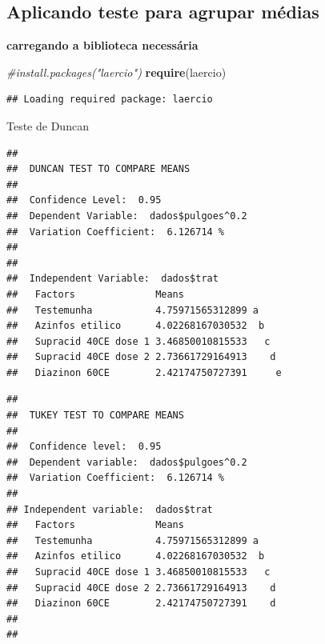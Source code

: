 \documentclass[
]{book}
\newenvironment{Shaded}{\begin{snugshade}}{\end{snugshade}}
\newcommand{\CommentTok}[1]{\textcolor[rgb]{0.56,0.35,0.01}{\textit{#1}}}
\newcommand{\KeywordTok}[1]{\textcolor[rgb]{0.13,0.29,0.53}{\textbf{#1}}}
\newcommand{\NormalTok}[1]{#1}
\newcommand{\StringTok}[1]{\textcolor[rgb]{0.31,0.60,0.02}{#1}}
\begin{document}
\hypertarget{aplicando-teste-para-agrupar-muxe9dias}{%
\subsection{Aplicando teste para agrupar médias}\label{aplicando-teste-para-agrupar-muxe9dias}}

\textbf{carregando a biblioteca necessária}

\begin{Shaded}
\begin{Highlighting}[]
\CommentTok{#install.packages("laercio")}
\KeywordTok{require}\NormalTok{(laercio)}
\end{Highlighting}
\end{Shaded}

\begin{verbatim}
## Loading required package: laercio
\end{verbatim}

Teste de Duncan

\begin{Shaded}
\end{Shaded}

\begin{verbatim}
## 
##  DUNCAN TEST TO COMPARE MEANS 
##  
##  Confidence Level:  0.95 
##  Dependent Variable:  dados$pulgoes^0.2
##  Variation Coefficient:  6.126714 % 
##  
## 
##  Independent Variable:  dados$trat 
##   Factors              Means                 
##   Testemunha           4.75971565312899 a    
##   Azinfos etilico      4.02268167030532  b   
##   Supracid 40CE dose 1 3.46850010815533   c  
##   Supracid 40CE dose 2 2.73661729164913    d 
##   Diazinon 60CE        2.42174750727391     e
\end{verbatim}

\begin{Shaded}
\end{Shaded}

\begin{verbatim}
## 
##  TUKEY TEST TO COMPARE MEANS 
##  
##  Confidence level:  0.95 
##  Dependent variable:  dados$pulgoes^0.2
##  Variation Coefficient:  6.126714 % 
##  
## Independent variable:  dados$trat 
##   Factors              Means                
##   Testemunha           4.75971565312899 a   
##   Azinfos etilico      4.02268167030532  b  
##   Supracid 40CE dose 1 3.46850010815533   c 
##   Supracid 40CE dose 2 2.73661729164913    d
##   Diazinon 60CE        2.42174750727391    d
## 
## 
\end{verbatim}
\end{document}
